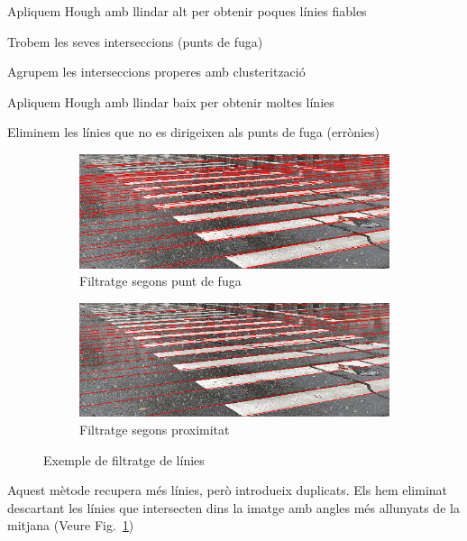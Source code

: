 \documentclass[10pt,a4paper,twocolumn,twoside]{article}
\begin{document}
\vspace*{-0.15em}
\begin{enumerate}[]
	{\small
	\item Apliquem Hough amb llindar alt per obtenir poques línies fiables
	\item Trobem les seves interseccions (punts de fuga)
	\item Agrupem les interseccions properes amb clusterització
	\item Apliquem Hough amb llindar baix per obtenir moltes línies
	\item Eliminem les línies que no es dirigeixen als punts de fuga (errònies)
}
\end{enumerate}
\begin{figure}[h]
	\centering
	\begin{subfigure}{0.45\columnwidth}
		\includegraphics[width=\linewidth]{figs/filtrat_fuga}
		\caption{Filtratge segons punt de fuga}
	\end{subfigure}
	\quad
	\begin{subfigure}{0.45\columnwidth}
		\includegraphics[width=\linewidth]{figs/filtrat_proximitat}
		\caption{Filtratge segons proximitat}
	\end{subfigure}
	\caption{Exemple de filtratge de línies}
	\label{fig:vores}
\end{figure}
\noindent
Aquest mètode recupera més línies, però introdueix duplicats. Els hem eliminat descartant les línies que intersecten dins la imatge amb angles més allunyats de la mitjana (Veure Fig.~\ref{fig:vores})
\end{document}
